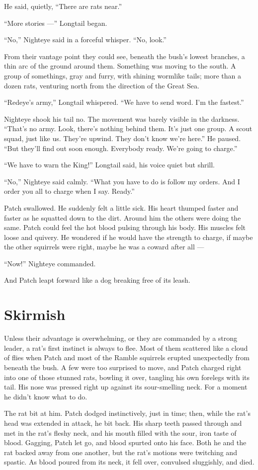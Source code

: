 \documentclass[ebook,oneside,openany,17pt]{memoir}
\newenvironment{tolerant}[1]{%
  \par\tolerance=#1\relax
}{%
  \par
}
\renewcommand{\thechapter}{\Roman{chapter}}
\newcounter{sections}
\newcommand{\sections}[1]{%
  \section*{#1}
  \addtocounter{sections}{1}%
  \pdfbookmark[1]{#1}{section.\thechapter.\thesections}}
\begin{document}
He said, quietly, “There are rats near.”

“More stories —” Longtail began.

“No,” Nighteye said in a forceful whisper. “No, look.”

From their vantage point they could see, beneath the bush’s lowest
branches, a thin arc of the ground around them. Something was moving
to the south. A group of somethings, gray and furry, with shining
wormlike tails; more than a dozen rats, venturing north from the
direction of the Great Sea.

“Redeye’s army,” Longtail whispered. “We have to send word. I’m the
fastest.”

Nighteye shook his tail no. The movement was barely visible in the
darkness. “That’s no army. Look, there’s nothing behind them. It’s
just one group. A scout squad, just like us. They’re upwind. They
don’t know we’re here.” He paused. “But they’ll find out soon
enough. Everybody ready. We’re going to charge.”

“We have to warn the King!” Longtail said, his voice quiet but shrill.

“No,” Nighteye said calmly. “What you have to do is follow my
orders. And I order you all to charge when I say. Ready.”

Patch swallowed. He suddenly felt a little sick. His heart thumped
faster and faster as he squatted down to the dirt. Around him the
others were doing the same. Patch could feel the hot blood pulsing
through his body. His muscles felt loose and quivery. He wondered if
he would have the strength to charge, if maybe the other squirrels
were right, maybe he was a coward after all —

“Now!” Nighteye commanded.

And Patch leapt forward like a dog breaking free of its leash.


\sections{Skirmish}

Unless their advantage is overwhelming, or they are commanded by a
strong leader, a rat’s first instinct is always to flee. Most of them
scattered like a cloud of flies when Patch and most of the Ramble
squirrels erupted unexpectedly from beneath the bush. A few were too
surprised to move, and Patch charged right into one of those stunned
rats, bowling it over, tangling his own forelegs with its tail. His
nose was pressed right up against its sour-smelling neck. For a moment
he didn’t know what to do.

\begin{tolerant}{1000}
The rat bit at him. Patch dodged instinctively, just in time; then,
while the rat’s head was extended in attack, he bit back. His sharp
teeth passed through and met in the rat’s fleshy neck, and his mouth
filled with the sour, iron taste of blood. Gagging, Patch let go, and
blood spurted onto his face. Both he and the rat backed away from one
another, but the rat’s motions were twitching and spastic. As blood
poured from its neck, it fell over, convulsed sluggishly, and died.
\end{tolerant}
\end{document}
